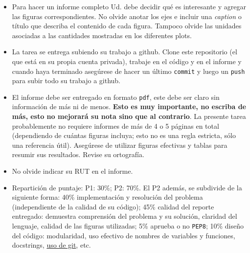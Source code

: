 \documentclass[letter, 11pt]{article}
\begin{document}
\begin{itemize}
\item Para hacer un informe completo Ud. debe decidir qué es interesante y
  agregar las figuras correspondientes. No olvide anotar los ejes e incluir una
  \emph{caption} o título que describa el contenido de cada figura. Tampoco
  olvide las unidades asociadas a las cantidades mostradas en los diferentes
  plots.

\item La tarea se entrega subiendo su trabajo a github. Clone este repositorio
  (el que está en su propia cuenta privada), trabaje en el código y en el
  informe y cuando haya terminado asegúrese de hacer un último \texttt{commit}
  y luego un \texttt{push} para subir todo su trabajo a github.

\item El informe debe ser entregado en formato \texttt{pdf}, este debe ser
  claro sin información de más ni de menos. \textbf{Esto es muy importante, no
  escriba de más, esto no mejorará su nota sino que al contrario}. La presente
  tarea probablemente no requiere informes de más de 4 o 5 páginas en total
  (dependiendo de cuántas figuras incluya; esto no es una regla estricta, sólo
  una referencia útil).  Asegúrese de utilizar figuras efectivas y tablas para
  resumir sus resultados. Revise su ortografía.

 \item No olvide indicar su RUT en el informe.

 \item Repartición de puntaje: P1: 30\%; P2: 70\%. El P2 además, se subdivide
   de la siguiente forma: 40\% implementación y resolución del problema
   (independiente de la calidad de su código); 45\% calidad del reporte
   entregado: demuestra comprensión del problema y su solución, claridad del
   lenguaje, calidad de las figuras utilizadas; 5\% aprueba o no \texttt{PEP8};
   10\% diseño del código: modularidad, uso efectivo de nombres de variables y
   funciones, docstrings, \underline{uso de git}, etc.

\end{itemize}

\end{document}

